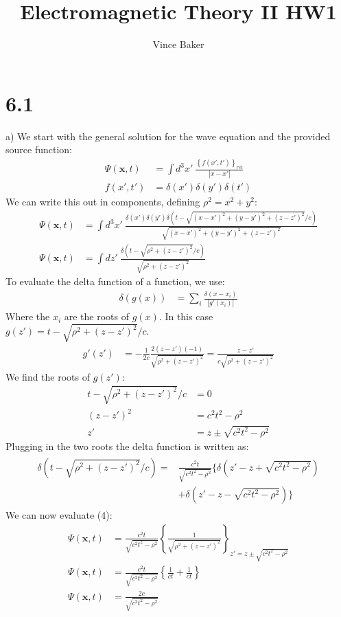 \documentclass[a4paper,11pt]{article}
\title{Electromagnetic Theory II HW1}
\author{Vince Baker}
\numberwithin{equation}{section}
\newcommand{\bv}[1]{\mathbf{#1}}
\newcommand{\lrb}[1]{\left\{{#1}\right\}}
\begin{document}
\maketitle

\section{6.1}
a) We start with the general solution for the wave equation and the provided source function:
\begin{align}
 \Psi(\bv{x},t) &= \int d^3x'\ \frac{\lrb{f(x',t')}_{ret}}{|x-x'|}\\
 f(x',t') &= \delta(x')\delta(y')\delta(t')
\end{align}
We can write this out in components, defining $\rho^2=x^2+y^2$:
\begin{align}
 \Psi(\bv{x},t) &= \int d^3x'\ \frac{\delta(x')\delta(y')\delta(t-\sqrt{(x-x')^2+(y-y')^2+(z-z')^2}/c)}{\sqrt{(x-x')^2+(y-y')^2+(z-z')^2}}\\
 \Psi(\bv{x},t) &= \int dz'\ \frac{\delta(t-\sqrt{\rho^2+(z-z')^2}/c)}{\sqrt{\rho^2+(z-z')^2}}
\end{align}
To evaluate the delta function of a function, we use:
\begin{align}
 \delta(g(x)) &= \sum_i \frac{\delta(x-x_i)}{|g'(x_i)|}
\end{align}
Where the $x_i$ are the roots of $g(x)$. In this case $g(z')=t-\sqrt{\rho^2+(z-z')^2}/c$.
\begin{align}
 g'(z') &= -\frac{1}{2c}\frac{2(z-z')(-1)}{\sqrt{\rho^2+(z-z')^2}} = \frac{z-z'}{c\sqrt{\rho^2+(z-z')^2}}
\end{align}
We find the roots of $g(z')$:
\begin{align}
 t-\sqrt{\rho^2+(z-z')^2}/c &= 0\\
 (z-z')^2 &= c^2t^2-\rho^2\\
 z' &= z \pm \sqrt{c^2t^2-\rho^2}
\end{align}
Plugging in the two roots the delta function is written as:
\begin{align}
\begin{split}
\delta(t-\sqrt{\rho^2+(z-z')^2}/c) = &\frac{c^2t}{\sqrt{c^2t^2-\rho^2}}\{\delta(z'-z+\sqrt{c^2t^2-\rho^2})\\
		  &+\delta(z'-z-\sqrt{c^2t^2-\rho^2})\}
\end{split}
\end{align}
We can now evaluate (4):
\begin{align}
 \Psi(\bv{x},t) &= \frac{c^2t}{\sqrt{c^2t^2-\rho^2}}\lrb{ \frac{1}{\sqrt{\rho^2+(z-z')^2}}}_{z'=z\pm\sqrt{c^2t^2-\rho^2}}\\ 
 \Psi(\bv{x},t) &= \frac{c^2t}{\sqrt{c^2t^2-\rho^2}}\lrb{\frac{1}{ct}+\frac{1}{ct}}\\
 \Psi(\bv{x},t) &= \frac{2c}{\sqrt{c^2t^2-\rho^2}}
\end{align}
\end{document}
